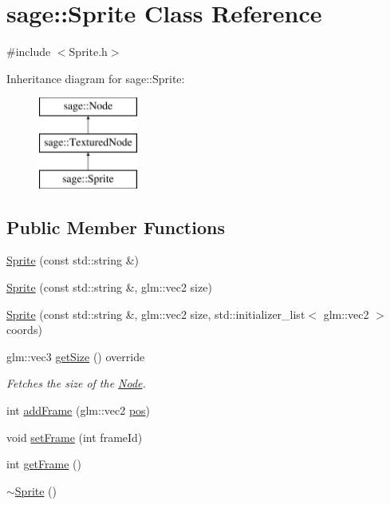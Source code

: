 \hypertarget{classsage_1_1Sprite}{}\section{sage\+::Sprite Class Reference}
\label{classsage_1_1Sprite}


{\ttfamily \#include $<$Sprite.\+h$>$}

Inheritance diagram for sage\+::Sprite\+:\begin{figure}[H]
\begin{center}
\leavevmode
\includegraphics[height=3.000000cm]{classsage_1_1Sprite}
\end{center}
\end{figure}
\subsection*{Public Member Functions}
\begin{DoxyCompactItemize}
\item 
\mbox{\hyperlink{classsage_1_1Sprite_abae47a15ec83a91f3b714db14f2a492b}{Sprite}} (const std\+::string \&)
\item 
\mbox{\hyperlink{classsage_1_1Sprite_a76a269d903de2837314b42c3d43f0df2}{Sprite}} (const std\+::string \&, glm\+::vec2 size)
\item 
\mbox{\hyperlink{classsage_1_1Sprite_a4ed2be3fab0b4869728be4f91cb67169}{Sprite}} (const std\+::string \&, glm\+::vec2 size, std\+::initializer\+\_\+list$<$ glm\+::vec2 $>$ coords)
\item 
glm\+::vec3 \mbox{\hyperlink{classsage_1_1Sprite_a4fbebafc74986ae399360118796dd069}{get\+Size}} () override
\begin{DoxyCompactList}\small\item\em Fetches the size of the \mbox{\hyperlink{classsage_1_1Node}{Node}}. \end{DoxyCompactList}\item 
int \mbox{\hyperlink{classsage_1_1Sprite_a7444391256eab0cf1b7a994885026352}{add\+Frame}} (glm\+::vec2 \mbox{\hyperlink{classsage_1_1Node_a26c32e5ec11e0ed7f33053ecac6830d5}{pos}})
\item 
void \mbox{\hyperlink{classsage_1_1Sprite_ada2cb241cf1fc71378372d04f19926e2}{set\+Frame}} (int frame\+Id)
\item 
int \mbox{\hyperlink{classsage_1_1Sprite_af7d9465b0ef867d23cbb587b6c7b6b13}{get\+Frame}} ()
\item 
\mbox{\hyperlink{classsage_1_1Sprite_a8accab430f9d90ae5117b57d67e32b84}{$\sim$\+Sprite}} ()
\end{DoxyCompactItemize}
